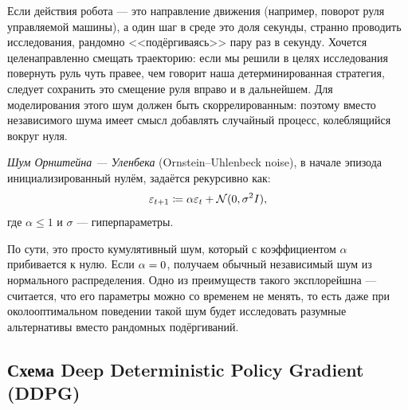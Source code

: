 \begin{example}
Если действия робота --- это направление движения (например, поворот руля управляемой машины), а один шаг в среде это доля секунды, странно проводить исследования, рандомно <<подёргиваясь>> пару раз в секунду. Хочется целенаправленно смещать траекторию: если мы решили в целях исследования повернуть руль чуть правее, чем говорит наша детерминированная стратегия, следует сохранить это смещение руля вправо и в дальнейшем. Для моделирования этого шум должен быть скоррелированным: поэтому вместо независимого шума имеет смысл добавлять случайный процесс, колеблящийся вокруг нуля.
\end{example}

\begin{definition}
\emph{Шум Орнштейна — Уленбека} (Ornstein–Uhlenbeck noise), в начале эпизода инициализированный нулём, задаётся рекурсивно как:
$$\varepsilon_{t + 1} \coloneqq \alpha \varepsilon_t + \mathcal{N}(0, \sigma^2I),$$
где $\alpha \le 1$ и $\sigma$ --- гиперпараметры.
\end{definition}

По сути, это просто кумулятивный шум, который с коэффициентом $\alpha$ прибивается к нулю. Если $\alpha \HM= 0$, получаем обычный независимый шум из нормального распределения. Одно из преимуществ такого эксплорейшна --- считается, что его параметры можно со временем не менять, то есть даже при околооптимальном поведении такой шум будет исследовать разумные альтернативы вместо рандомных подёргиваний.


\subsection{Схема Deep Deterministic Policy Gradient (DDPG)}


